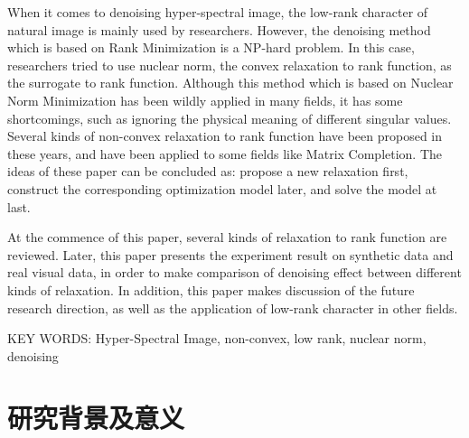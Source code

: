 \documentclass[12pt, a4paper]{article}
\begin{document}
\par When it comes to denoising hyper-spectral image, the low-rank character of natural image is mainly used by researchers. However, the denoising method which is based on Rank Minimization is a NP-hard problem. In this case, researchers tried to use nuclear norm, the convex relaxation to rank function, as the surrogate to rank function. Although this method which is based on Nuclear Norm Minimization has been wildly applied in many fields, it has some shortcomings, such as ignoring the physical meaning of different singular values. Several kinds of non-convex relaxation to rank function have been proposed in these years, and have been applied to some fields like Matrix Completion. The ideas of these paper can be concluded as: propose a new relaxation first, construct the corresponding optimization model later, and solve the model at last.
\par At the commence of this paper, several kinds of relaxation to rank function are reviewed. Later, this paper presents the experiment result on synthetic data and real visual data, in order to make comparison of denoising effect between different kinds of relaxation. In addition, this paper makes discussion of the future research direction, as well as the application of low-rank character in other fields.
\\
\newline
\par KEY WORDS: Hyper-Spectral Image, non-convex, low rank, nuclear norm, denoising
\newpage
{{\tableofcontents}}
\newpage
{}
\pagestyle{fancy}
\lhead{}
\rhead{}
\section{研究背景及意义}
\end{document}
